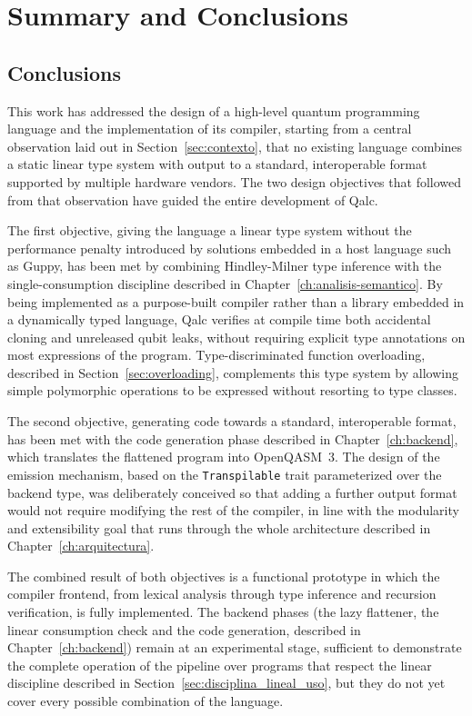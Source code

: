 \chapter{Summary and Conclusions}
\label{ch:conclusions}

\section{Conclusions}

This work has addressed the design of a high-level quantum programming language and the implementation of its compiler, starting from a central observation laid out in Section~\ref{sec:contexto}, that no existing language combines a static linear type system with output to a standard, interoperable format supported by multiple hardware vendors. The two design objectives that followed from that observation have guided the entire development of Qalc.

The first objective, giving the language a linear type system without the performance penalty introduced by solutions embedded in a host language such as Guppy, has been met by combining Hindley-Milner type inference with the single-consumption discipline described in Chapter~\ref{ch:analisis-semantico}. By being implemented as a purpose-built compiler rather than a library embedded in a dynamically typed language, Qalc verifies at compile time both accidental cloning and unreleased qubit leaks, without requiring explicit type annotations on most expressions of the program. Type-discriminated function overloading, described in Section~\ref{sec:overloading}, complements this type system by allowing simple polymorphic operations to be expressed without resorting to type classes.

The second objective, generating code towards a standard, interoperable format, has been met with the code generation phase described in Chapter~\ref{ch:backend}, which translates the flattened program into OpenQASM~3. The design of the emission mechanism, based on the \lstinline|Transpilable| trait parameterized over the backend type, was deliberately conceived so that adding a further output format would not require modifying the rest of the compiler, in line with the modularity and extensibility goal that runs through the whole architecture described in Chapter~\ref{ch:arquitectura}.

The combined result of both objectives is a functional prototype in which the compiler frontend, from lexical analysis through type inference and recursion verification, is fully implemented. The backend phases (the lazy flattener, the linear consumption check and the code generation, described in Chapter~\ref{ch:backend}) remain at an experimental stage, sufficient to demonstrate the complete operation of the pipeline over programs that respect the linear discipline described in Section~\ref{sec:disciplina_lineal_uso}, but they do not yet cover every possible combination of the language.

